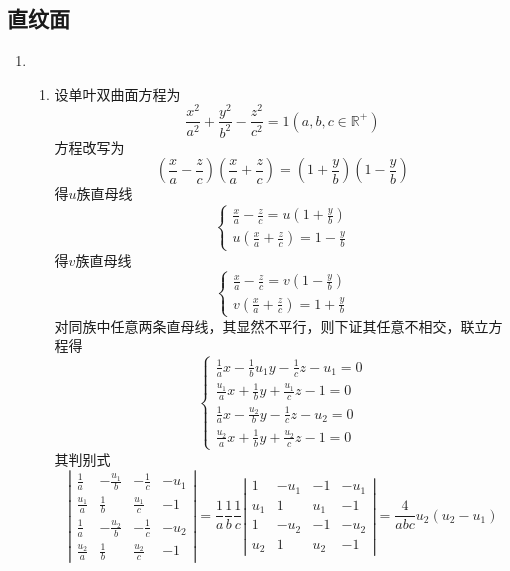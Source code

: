 \documentclass[UTF8]{ctexart}
\begin{document}
\subsection{直纹面}
\begin{enumerate}

\item \begin{enumerate}[(1)]
\item 设单叶双曲面方程为$$\frac{x^2}{a^2}+\frac{y^2}{b^2}-\frac{z^2}{c^2}=1\left(a,b,c\in\mathbb{R^+}\right)$$方程改写为$$\left(\frac{x}{a}-\frac{z}{c}\right)\left(\frac{x}{a}+\frac{z}{c}\right)=\left(1+\frac{y}{b}\right)\left(1-\frac{y}{b}\right)$$
得$u$族直母线$$\left\{\begin{array}{l}\displaystyle\frac{x}{a}-\displaystyle\frac{z}{c}=u\left(1+\displaystyle\frac{y}{b}\right)\\u\left(\displaystyle\frac{x}{a}+\displaystyle\frac{z}{c}\right)=1-\displaystyle\frac{y}{b}\end{array}\right.$$
得$v$族直母线$$\left\{\begin{array}{l}\displaystyle\frac{x}{a}-\frac{z}{c}=v\left(1-\frac{y}{b}\right)\\\displaystyle v\left(\frac{x}{a}+\frac{z}{c}\right)=1+\frac{y}{b}\end{array}\right.$$
对同族中任意两条直母线，其显然不平行，则下证其任意不相交，联立方程得$$\left\{\begin{array}{l}\displaystyle\frac{1}{a}x-\frac{1}{b}u_1y-\frac{1}{c}z-u_1=0\\\displaystyle\frac{u_1}{a}x+\frac{1}{b}y+\frac{u_1}{c}z-1=0\\\displaystyle\frac{1}{a}x-\frac{u_2}{b}y-\frac{1}{c}z-u_2=0\\\displaystyle\frac{u_2}{a}x+\frac{1}{b}y+\frac{u_2}{c}z-1=0\end{array}\right.$$
其判别式$$\left|\begin{array}{cccc}\displaystyle\frac{1}{a}&-\displaystyle\frac{u_1}{b}&-\displaystyle\frac{1}{c}&-u_1\\\displaystyle\frac{u_1}{a}&\displaystyle\frac{1}{b}&\displaystyle\frac{u_1}{c}&-1\\\displaystyle\frac{1}{a}&-\displaystyle\frac{u_2}{b}&\displaystyle-\frac{1}{c}&-u_2\\\displaystyle\frac{u_2}{a}&\displaystyle\frac{1}{b}&\displaystyle\frac{u_2}{c}&-1\end{array}\right|=\displaystyle\frac{1}{a}\displaystyle\frac{1}{b}\displaystyle\frac{1}{c}\left|\begin{array}{cccc}1&-u_1&-1&-u_1\\u_1&1&u_1&-1\\1&-u_2&-1&-u_2\\u_2&1&u_2&-1\end{array}\right|=\displaystyle\frac{4}{abc}u_2\left(u_2-u_1\right)$$

\end{enumerate}
\end{enumerate}
\end{document}
